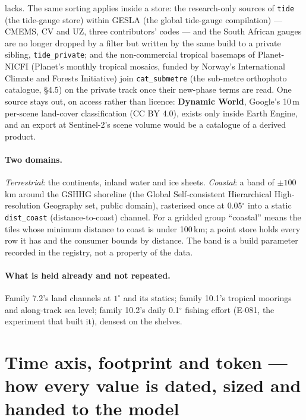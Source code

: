 \documentclass[10pt]{article}
\newcommand{\code}[1]{\texttt{#1}}
\begin{document}
lacks. The same sorting applies inside a store: the research-only
sources of \code{tide} (the tide-gauge store) within GESLA (the global tide-gauge compilation) --- CMEMS, CV and UZ, three contributors' codes --- and the South African gauges are no longer
dropped by a filter but written by the same build to a private sibling,
\code{tide\_private}; and the non-commercial tropical basemaps of Planet-NICFI (Planet's monthly tropical mosaics, funded by Norway's International Climate and Forests Initiative)
join \code{cat\_submetre} (the sub-metre orthophoto catalogue, \S4.5) on the private track once their new-phase terms
are read. One source stays out, on access rather than licence:
\textbf{Dynamic World}, Google's 10\,m per-scene land-cover classification
(CC BY 4.0), exists only inside Earth Engine, and an export at Sentinel-2's
scene volume would be a catalogue of a derived product.

\paragraph{Two domains.} \emph{Terrestrial}: the continents, inland water
and ice sheets. \emph{Coastal}: a band of $\pm 100$\,km around the GSHHG
shoreline (the Global Self-consistent Hierarchical High-resolution Geography
set, public domain), rasterised once at 0.05$^\circ$ into a static
\code{dist\_coast} (distance-to-coast) channel. For a gridded group ``coastal'' means the tiles
whose minimum distance to coast is under 100\,km; a point store holds every
row it has and the consumer bounds by distance. The band is a build
parameter recorded in the registry, not a property of the data.

\paragraph{What is held already and not repeated.} Family 7.2's land
channels at $1^\circ$ and its statics; family 10.1's tropical moorings and
along-track sea level; family 10.2's daily 0.1$^\circ$ fishing effort
(E-081, the experiment that built it), densest on the shelves.

\section{Time axis, footprint and token --- how every value is dated, sized and handed to the model}
\end{document}
